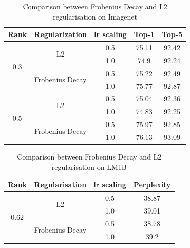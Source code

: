 \documentclass{article}
\begin{document}
\begin{table}[t]
\centering
\begin{tabular}{|c|c|c|c|c|}
\hline
\textbf{Rank} & \textbf{Regularization} & \textbf{lr scaling} & \textbf{Top-1} & \textbf{Top-5} \\
\hline
\hline

\multirow{4}{*}{0.3} & \multirow{2}{*}{L2}  & 0.5  & 75.11 & 92.42 \\
                & & 1.0 & 74.9 & 92.24 \\
\cline{2-5}
& \multirow{2}{*}{Frobenius Decay} & 0.5  & 75.22 & 92.49 \\
                   &  & 1.0 & 75.77 & 92.87 \\
\hline
\multirow{4}{*}{0.5} & \multirow{2}{*}{L2} & 0.5  & 75.04 & 92.36 \\
                   & & 1.0 & 74.83 & 92.25 \\
\cline{2-5}
& \multirow{2}{*}{Frobenius Decay} &  0.5  & 75.97 & 92.85 \\
                   & & 1.0 & 76.13 & 93.09 \\
\hline

\end{tabular}
\caption{Comparison between Frobenius Decay and L2 regularisation on Imagenet}
\label{imagenet_l2}
\end{table}

\begin{table}[t]
\centering
\begin{tabular}{|c|c|c|c|}
\hline
Rank & \textbf{Regularisation} & \textbf{lr scaling} & \textbf{Perplexity} \\
\hline
\hline

\multirow{4}{*}{0.62} &  \multirow{2}{*}{L2} & 0.5 & 38.87 \\
                     &                       & 1.0 & 39.01 \\
\cline{2-4}
                     &  \multirow{2}{*}{Frobenius Decay} & 0.5 & 38.78 \\
                     &                       & 1.0 & 39.2 \\
\hline

\end{tabular}
\caption{Comparison between Frobenius Decay and L2 regularisation on LM1B}
\label{transformer_l2}
\end{table}
\end{document}
